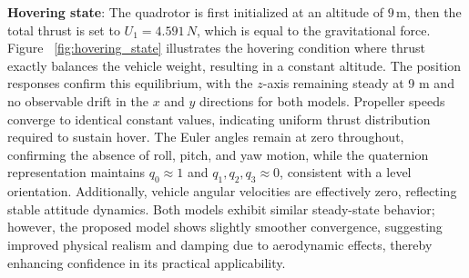 
\textbf{Hovering state}: The quadrotor is first initialized at an altitude of $9\,\text{m}$, 
then the total thrust is set to $U_{1}=4.591\,N$, which is equal to 
the gravitational force.
Figure ~\ref{fig:hovering_state} illustrates the hovering condition where thrust exactly balances the vehicle weight, resulting in a constant altitude. The position responses confirm this equilibrium, with the \(z\)-axis remaining steady at 9 m and no observable drift in the \(x\) and \(y\) directions for both models. Propeller speeds converge to identical constant values, indicating uniform thrust distribution required to sustain hover. The Euler angles remain at zero throughout, confirming the absence of roll, pitch, and yaw motion, while the quaternion representation maintains \(q_0 \approx 1\) and \(q_1, q_2, q_3 \approx 0\), consistent with a level orientation. Additionally, vehicle angular velocities are effectively zero, reflecting stable attitude dynamics. Both models exhibit similar steady-state behavior; however, the proposed model shows slightly smoother convergence, suggesting improved physical realism and damping due to aerodynamic effects, thereby enhancing confidence in its practical applicability.


